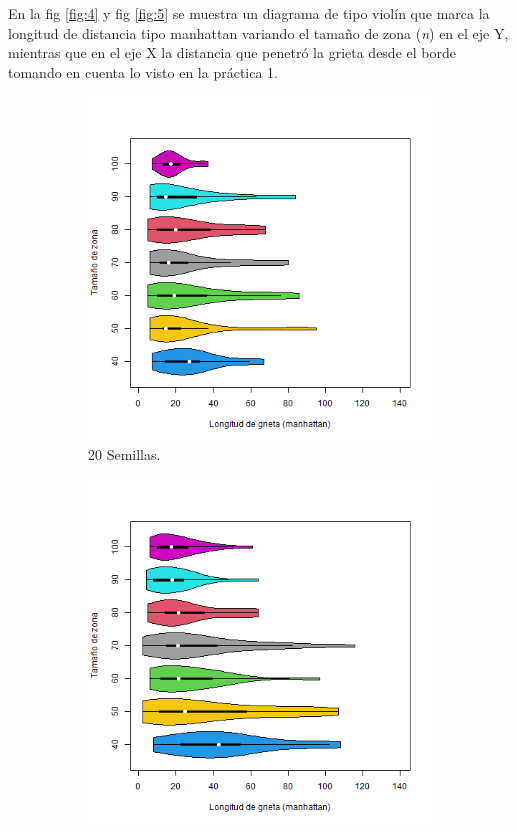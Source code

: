 \documentclass[a4paper]{article}
\begin{document}
\justify En la fig \ref{fig:4} y fig \ref{fig:5} se muestra un diagrama de tipo violín que marca la longitud de distancia tipo manhattan variando el tamaño de zona (\textit{n}) en el eje Y, mientras que en el eje X la distancia que penetró la grieta desde el borde tomando en cuenta lo visto en la práctica 1. 

\begin{figure}[h!]
    \centering
\begin{subfigure}[b]{0.45\linewidth}
\includegraphics[width=\linewidth]{p4_semillas20.png}
\caption{20 Semillas.}
\label{c1}
\end{subfigure}
\begin{subfigure}[b]{0.45\linewidth}
\includegraphics[width=\linewidth]{p4_semillas40.png}

\end{subfigure}
\end{figure}
\end{document}
